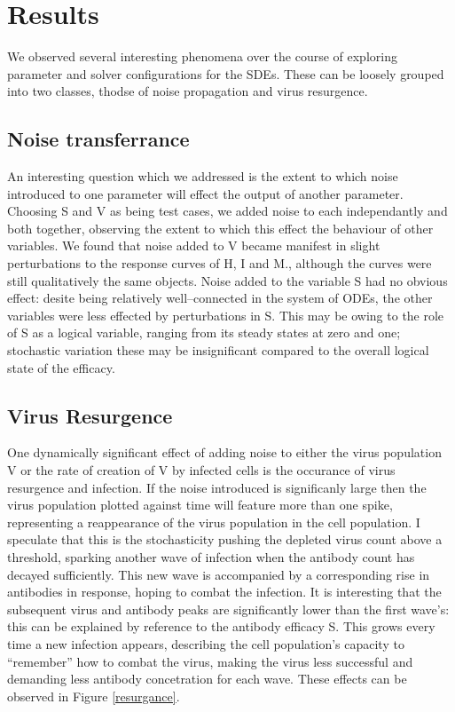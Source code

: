 \documentclass[a4paper, 12pt]{report}
\begin{document}
\section{Results}

We observed several interesting phenomena over the course of exploring parameter and solver configurations for the SDEs. These can be loosely grouped into two classes, thodse of noise propagation and virus resurgence.

\subsection{Noise transferrance}

An interesting question which we addressed is the extent to which noise introduced to one parameter will effect the output of another parameter. Choosing S and V as being test cases, we added noise to each independantly and both together, observing the extent to which this effect the behaviour of other variables. We found that noise added to V became manifest in slight perturbations to the response curves of H, I and M., although the curves were still qualitatively the same objects. Noise added to the variable S had no obvious effect: desite being relatively well--connected in the system of ODEs, the other variables were less effected by perturbations in S. This may be owing to the role of S as a logical variable, ranging from its steady states at zero and one; stochastic variation these may be insignificant compared to the overall logical state of the efficacy.

\subsection{Virus Resurgence}

One dynamically significant effect of adding noise to either the virus population V or the rate of creation of V by infected cells is the occurance of virus resurgence and infection. If the noise introduced is significanly large then the virus population plotted against time will feature more than one spike, representing a reappearance of the virus population in the cell population. I speculate that this is the stochasticity pushing the depleted virus count above a threshold, sparking another wave of infection when the antibody count has decayed sufficiently. This new wave is accompanied by a corresponding rise in antibodies in response, hoping to combat the infection. It is interesting that the subsequent virus and antibody peaks are significantly lower than the first wave's: this can be explained by reference to the antibody efficacy S. This grows every time a new infection appears, describing the cell population's capacity to ``remember'' how to combat the virus, making the virus less successful and demanding less antibody concetration for each wave. These effects can be observed in Figure \ref{resurgance}.
\end{document}

